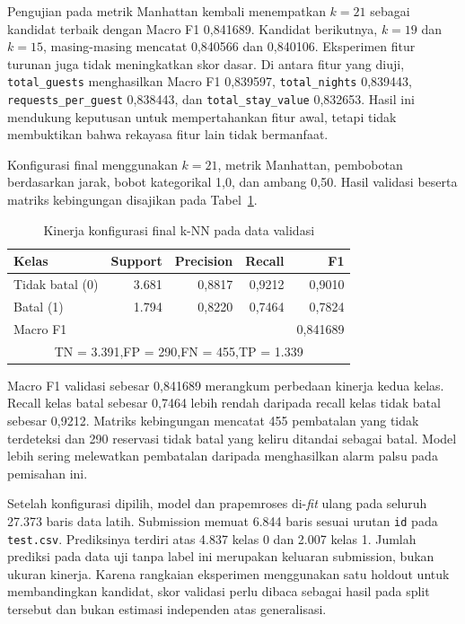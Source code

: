 Pengujian pada metrik Manhattan kembali menempatkan $k=21$ sebagai kandidat terbaik dengan Macro F1 0,841689. Kandidat berikutnya, $k=19$ dan $k=15$, masing-masing mencatat 0,840566 dan 0,840106. Eksperimen fitur turunan juga tidak meningkatkan skor dasar. Di antara fitur yang diuji, \texttt{total\_guests} menghasilkan Macro F1 0,839597, \texttt{total\_nights} 0,839443, \texttt{requests\_per\_guest} 0,838443, dan \texttt{total\_stay\_value} 0,832653. Hasil ini mendukung keputusan untuk mempertahankan fitur awal, tetapi tidak membuktikan bahwa rekayasa fitur lain tidak bermanfaat.

Konfigurasi final menggunakan $k=21$, metrik Manhattan, pembobotan berdasarkan jarak, bobot kategorikal 1,0, dan ambang 0,50. Hasil validasi beserta matriks kebingungan disajikan pada Tabel~\ref{tab-knn-final}.

\begin{table}[H]
    \centering
    \caption{Kinerja konfigurasi final k-NN pada data validasi}
    \label{tab-knn-final}
    \begin{tabular}{lrrrr}
        \hline
        Kelas                        & Support  & Precision & Recall & F1             \\
        \hline
        Tidak batal (0)              & 3.681    & 0,8817    & 0,9212 & 0,9010         \\
        Batal (1)                    & 1.794    & 0,8220    & 0,7464 & 0,7824         \\
        \hline
        \multicolumn{4}{l}{Macro F1} & 0,841689                                       \\
        \hline
        \multicolumn{5}{c}{TN = 3.391,\quad FP = 290,\quad FN = 455,\quad TP = 1.339} \\
        \hline
    \end{tabular}
\end{table}

Macro F1 validasi sebesar 0,841689 merangkum perbedaan kinerja kedua kelas. Recall kelas batal sebesar 0,7464 lebih rendah daripada recall kelas tidak batal sebesar 0,9212. Matriks kebingungan mencatat 455 pembatalan yang tidak terdeteksi dan 290 reservasi tidak batal yang keliru ditandai sebagai batal. Model lebih sering melewatkan pembatalan daripada menghasilkan alarm palsu pada pemisahan ini.

Setelah konfigurasi dipilih, model dan prapemroses di-\textit{fit} ulang pada seluruh 27.373 baris data latih. Submission memuat 6.844 baris sesuai urutan \texttt{id} pada \texttt{test.csv}. Prediksinya terdiri atas 4.837 kelas 0 dan 2.007 kelas 1. Jumlah prediksi pada data uji tanpa label ini merupakan keluaran submission, bukan ukuran kinerja. Karena rangkaian eksperimen menggunakan satu holdout untuk membandingkan kandidat, skor validasi perlu dibaca sebagai hasil pada split tersebut dan bukan estimasi independen atas generalisasi.

